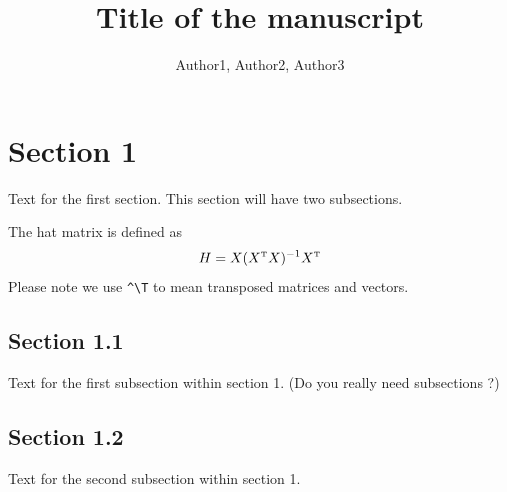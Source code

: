 \documentclass[twoside]{report}
\begin{document}

\title{Title of the manuscript}

\author{Author1, Author2, Author3}





\maketitle



\section{Section 1}
Text for the first section. This section will have two subsections.

The hat matrix is defined as
$$
H=X(X^{ \mathrm{\scriptscriptstyle T} } X)^{-1}X^{ \mathrm{\scriptscriptstyle T} }
$$
Please note we use \verb|^\T| to mean transposed matrices and vectors.

\subsection{Section 1.1}
Text for the first subsection within section 1. (Do you really need subsections ?)
\subsection{Section 1.2}
Text for the second subsection within section 1.
\end{document}
